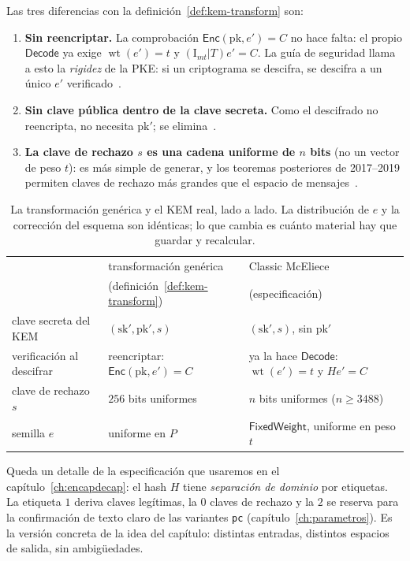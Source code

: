 \documentclass[11pt,a4paper,oneside]{report}
\newcommand{\wt}{\operatorname{wt}}
\begin{document}
Las tres diferencias con la definición~\ref{def:kem-transform} son:

\begin{enumerate}[leftmargin=1.8em,itemsep=3pt]
  \item \textbf{Sin reencriptar.} La comprobación
        $\textsf{Enc}(\mathrm{pk},e')=C$ no hace falta: el propio
        $\textsf{Decode}$ ya exige $\wt(e')=t$ y
        $(\mathrm{I}_{mt}|T)e'=C$. La guía de seguridad llama a esto la
        \emph{rigidez} de la PKE: si un criptograma se descifra, se
        descifra a un único $e'$ verificado~\cite{cmsecurity}.
  \item \textbf{Sin clave pública dentro de la clave secreta.} Como el
        descifrado no reencripta, no necesita $\mathrm{pk}'$; se
        elimina~\cite{cmsecurity}.
  \item \textbf{La clave de rechazo $s$ es una cadena uniforme de $n$
        bits} (no un vector de peso $t$): es más simple de generar, y
        los teoremas posteriores de 2017--2019 permiten claves de
        rechazo más grandes que el espacio de
        mensajes~\cite{hhk2017,bp2018,bindel2019}.
\end{enumerate}

\begin{table}[htbp]
\centering
\small
\begin{tabular}{p{3.4cm} p{5.1cm} p{5.3cm}}
\toprule
 & transformación genérica & Classic McEliece \\
 & (definición~\ref{def:kem-transform}) & (especificación) \\
\midrule
clave secreta del KEM & $(\mathrm{sk}',\mathrm{pk}',s)$
  & $(\mathrm{sk}',s)$, sin $\mathrm{pk}'$ \\
verificación al descifrar & reencriptar:
  $\textsf{Enc}(\mathrm{pk},e')=C$
  & ya la hace $\textsf{Decode}$: $\wt(e')=t$ y $He'=C$ \\
clave de rechazo $s$ & $256$ bits uniformes
  & $n$ bits uniformes ($n\ge3488$) \\
semilla $e$ & uniforme en $P$
  & $\textsf{FixedWeight}$, uniforme en peso $t$ \\
\bottomrule
\end{tabular}
\caption{La transformación genérica y el KEM real, lado a lado. La
distribución de $e$ y la corrección del esquema son idénticas; lo que
cambia es cuánto material hay que guardar y recalcular.}
\label{tab:kem-cm}
\end{table}

Queda un detalle de la especificación que usaremos en el
capítulo~\ref{ch:encapdecap}: el hash $H$ tiene \emph{separación de
dominio} por etiquetas. La etiqueta $1$ deriva claves legítimas, la
$0$ claves de rechazo y la $2$ se reserva para la confirmación de texto
claro de las variantes \texttt{pc} (capítulo~\ref{ch:parametros}). Es
la versión concreta de la idea del capítulo: distintas entradas,
distintos espacios de salida, sin ambigüedades.
\end{document}

